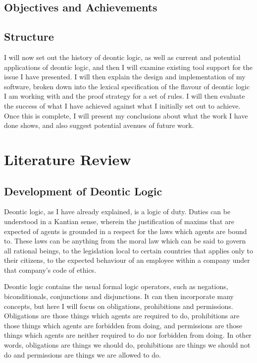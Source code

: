 \documentclass{l4proj}
\begin{document}
\section{Objectives and Achievements} %

\section{Structure}
I will now set out the history of deontic logic, as well as current and potential applications of deontic logic, and then I will examine existing tool support for the issue I have presented. I will then explain the design and implementation of my software, broken down into the lexical specification of the flavour of deontic logic I am working with and the proof strategy for a set of rules. I will then evaluate the success of what I have achieved against what I initially set out to achieve. Once this is complete, I will present my conclusions about what the work I have done shows, and also suggest potential avenues of future work. 

\chapter{Literature Review}

\section{Development of Deontic Logic}%
Deontic logic, as I have already explained, is a logic of duty. Duties can be understood in a Kantian sense, wherein the justification of maxims that are expected of agents is grounded in a respect for the laws which agents are bound to\cite{sep-kant-moral}. These laws can be anything from the moral law which can be said to govern all rational beings, to the legislation local to certain countries that applies only to their citizens, to the expected behaviour of an employee within a company under that company's code of ethics. 

Deontic logic contains the usual formal logic operators, such as negations, biconditionals, conjunctions and disjunctions. It can then incorporate many concepts, but here I will focus on obligations, prohibitions and permissions. Obligations are those things which agents are required to do, prohibitions are those things which agents are forbidden from doing, and permissions are those things which agents are neither required to do nor forbidden from doing. In other words, obligations are things we should do, prohibitions are things we should not do and permissions are things we are allowed to do. 
\end{document}
